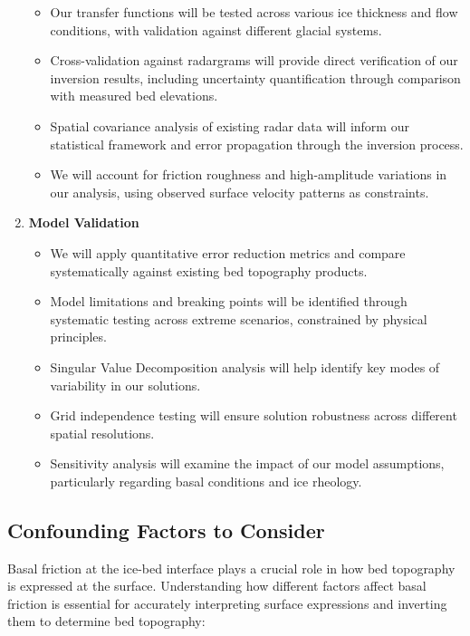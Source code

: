 \begin{enumerate}
\begin{itemize}
    \item Our transfer functions will be tested across various ice thickness and flow conditions, with validation against different glacial systems.
    
    \item Cross-validation against radargrams will provide direct verification of our inversion results, including uncertainty quantification through comparison with measured bed elevations.
    
    \item Spatial covariance analysis of existing radar data will inform our statistical framework and error propagation through the inversion process.
    
    \item We will account for friction roughness and high-amplitude variations in our analysis, using observed surface velocity patterns as constraints.
    \end{itemize}

\item\textbf{Model Validation}
    \begin{itemize}
    \item We will apply quantitative error reduction metrics and compare systematically against existing bed topography products.
    
    \item Model limitations and breaking points will be identified through systematic testing across extreme scenarios, constrained by physical principles.
    
    \item Singular Value Decomposition analysis will help identify key modes of variability in our solutions.
    
    \item Grid independence testing will ensure solution robustness across different spatial resolutions.
    
    \item Sensitivity analysis will examine the impact of our model assumptions, particularly regarding basal conditions and ice rheology.
    \end{itemize}
\end{enumerate}


\subsection*{Confounding Factors to Consider}

Basal friction at the ice-bed interface plays a crucial role in how bed topography is expressed at the surface. Understanding how different factors affect basal friction is essential for accurately interpreting surface expressions and inverting them to determine bed topography:

